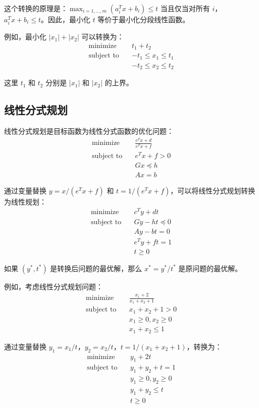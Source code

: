 \documentclass[12pt,a4paper]{book}
\begin{document}
这个转换的原理是：$\max_{i=1,\dots,m} (a_i^T x + b_i) \leq t$ 当且仅当对所有 $i$，$a_i^T x + b_i \leq t$。因此，最小化 $t$ 等价于最小化分段线性函数。

例如，最小化 $|x_1| + |x_2|$ 可以转换为：
$$
\begin{aligned}
\text{minimize} \quad & t_1 + t_2 \\
\text{subject to} \quad & -t_1 \leq x_1 \leq t_1 \\
& -t_2 \leq x_2 \leq t_2
\end{aligned}
$$

这里 $t_1$ 和 $t_2$ 分别是 $|x_1|$ 和 $|x_2|$ 的上界。

\subsection{线性分式规划}

线性分式规划是目标函数为线性分式函数的优化问题：
$$
\begin{aligned}
\text{minimize} \quad & \frac{c^T x + d}{e^T x + f} \\
\text{subject to} \quad & e^T x + f > 0 \\
& Gx \preceq h \\
& Ax = b
\end{aligned}
$$

通过变量替换 $y = x/(e^T x + f)$ 和 $t = 1/(e^T x + f)$，可以将线性分式规划转换为线性规划：
$$
\begin{aligned}
\text{minimize} \quad & c^T y + dt \\
\text{subject to} \quad & Gy - ht \preceq 0 \\
& Ay - bt = 0 \\
& e^T y + ft = 1 \\
& t \geq 0
\end{aligned}
$$

如果 $(y^*, t^*)$ 是转换后问题的最优解，那么 $x^* = y^*/t^*$ 是原问题的最优解。

例如，考虑线性分式规划问题：
$$
\begin{aligned}
\text{minimize} \quad & \frac{x_1 + 2}{x_1 + x_2 + 1} \\
\text{subject to} \quad & x_1 + x_2 + 1 > 0 \\
& x_1 \geq 0, x_2 \geq 0 \\
& x_1 + x_2 \leq 1
\end{aligned}
$$

通过变量替换 $y_1 = x_1/t$，$y_2 = x_2/t$，$t = 1/(x_1 + x_2 + 1)$，转换为：
$$
\begin{aligned}
\text{minimize} \quad & y_1 + 2t \\
\text{subject to} \quad & y_1 + y_2 + t = 1 \\
& y_1 \geq 0, y_2 \geq 0 \\
& y_1 + y_2 \leq t \\
& t \geq 0
\end{aligned}
$$
\end{document}

